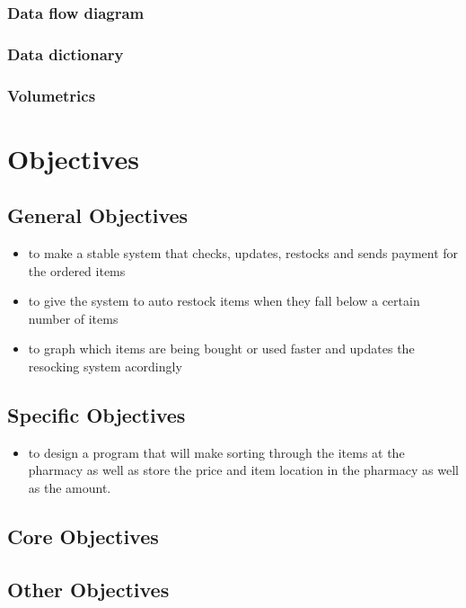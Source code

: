 \subsubsection{Data flow diagram}

\subsubsection{Data dictionary}

\subsubsection{Volumetrics}

\section{Objectives}

\subsection{General Objectives}
\begin{itemize}
	\item to make a stable system that checks, updates, restocks and sends payment for the ordered items
	\item to give the system to auto restock items when they fall below a certain number of items
	\item to graph which items are being bought or used faster and updates the resocking system acordingly 
\end{itemize}
\subsection{Specific Objectives}
\begin{itemize}
	\item to design a program that will make sorting through the items at the pharmacy as well as store the price and item location in the pharmacy as well as the amount.
\end{itemize}
\subsection{Core Objectives}

\subsection{Other Objectives}

